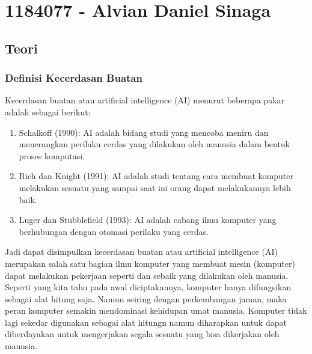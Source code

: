 \section{1184077 - Alvian Daniel Sinaga}

\subsection{Teori}
\subsubsection{Definisi Kecerdasan Buatan}
\hfill\break
Kecerdasan buatan atau artificial intelligence (AI) menurut beberapa pakar adalah sebagai berikut:
\begin{enumerate}
	\item Schalkoff (1990): AI adalah bidang studi yang mencoba meniru dan menerangkan perilaku cerdas yang dilakukan oleh manusia dalam bentuk proses komputasi.
	\item Rich dan Knight (1991): AI adalah studi tentang cara membuat komputer melakukan sesuatu yang sampai saat ini orang dapat melakukannya lebih baik.
	\item Luger dan Stubblefield (1993): AI adalah cabang ilmu komputer yang berhubungan dengan otomasi perilaku yang cerdas.
\end{enumerate}

\noindent
Jadi dapat disimpulkan kecerdasan buatan atau artificial intelligence (AI) merupakan salah satu bagian ilmu komputer yang membuat mesin (komputer) dapat melakukan pekerjaan seperti dan sebaik yang dilakukan oleh manusia. Seperti yang kita tahu pada awal diciptakannya, komputer hanya difungsikan sebagai alat hitung saja. Namun seiring dengan perkembangan jaman, maka peran komputer semakin mendominasi kehidupan umat manusia. Komputer tidak lagi sekedar digunakan sebagai alat hitungn namun diharapkan untuk dapat diberdayakan untuk mengerjakan segala sesuatu yang bisa dikerjakan oleh manusia.

